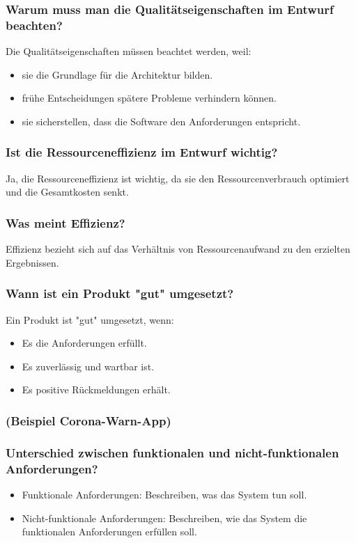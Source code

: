 \documentclass[main.tex]{subfiles}
\begin{document}
\subsubsection*{Warum muss man die Qualitätseigenschaften im Entwurf beachten?}
Die Qualitätseigenschaften müssen beachtet werden, weil:
\begin{itemize}
    \item sie die Grundlage für die Architektur bilden.
    \item frühe Entscheidungen spätere Probleme verhindern können.
    \item sie sicherstellen, dass die Software den Anforderungen entspricht.
\end{itemize}

\subsubsection*{Ist die Ressourceneffizienz im Entwurf wichtig?}
Ja, die Ressourceneffizienz ist wichtig, da sie den Ressourcenverbrauch optimiert und die Gesamtkosten senkt.


\subsubsection*{Was meint Effizienz?}
Effizienz bezieht sich auf das Verhältnis von Ressourcenaufwand zu den erzielten Ergebnissen.

\subsubsection*{Wann ist ein Produkt "gut" umgesetzt?}
Ein Produkt ist "gut" umgesetzt, wenn:
\begin{itemize}
    \item Es die Anforderungen erfüllt.
    \item Es zuverlässig und wartbar ist.
    \item Es positive Rückmeldungen erhält.
\end{itemize}

\subsubsection*{(Beispiel Corona-Warn-App)} %

\subsubsection*{Unterschied zwischen funktionalen und nicht-funktionalen Anforderungen?}
\begin{itemize}
    \item Funktionale Anforderungen: Beschreiben, was das System tun soll.
    \item Nicht-funktionale Anforderungen: Beschreiben, wie das System die funktionalen Anforderungen erfüllen soll.
\end{itemize}
\end{document}
